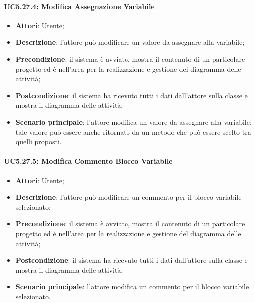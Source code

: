 \paragraph{UC5.27.4: Modifica Assegnazione Variabile}
\label{UC5.27.4}
\begin{itemize}
	\item \textbf{Attori}: Utente;
	\item \textbf{Descrizione}: l'attore può modificare un valore da assegnare alla variabile;
	\item \textbf{Precondizione}: il sistema è avviato, mostra il contenuto di un particolare progetto ed è nell'area per la realizzazione e gestione del diagramma delle attività;
	\item \textbf{Postcondizione}: il sistema ha ricevuto tutti i dati dall'attore sulla classe e mostra il diagramma delle attività;
	\item \textbf{Scenario principale}: l'attore modifica un valore da assegnare alla variabile: tale valore può essere anche ritornato da un metodo che può essere scelto tra quelli proposti.
\end{itemize}

\paragraph{UC5.27.5: Modifica Commento Blocco Variabile}
\label{UC5.27.5}
\begin{itemize}
	\item \textbf{Attori}: Utente;
	\item \textbf{Descrizione}: l'attore può modificare un commento per il blocco variabile selezionato;
	\item \textbf{Precondizione}: il sistema è avviato, mostra il contenuto di un particolare progetto ed è nell'area per la realizzazione e gestione del diagramma delle attività;
	\item \textbf{Postcondizione}: il sistema ha ricevuto tutti i dati dall'attore sulla classe e mostra il diagramma delle attività;
	\item \textbf{Scenario principale}: l'attore modifica un commento per il blocco variabile selezionato.
\end{itemize}

